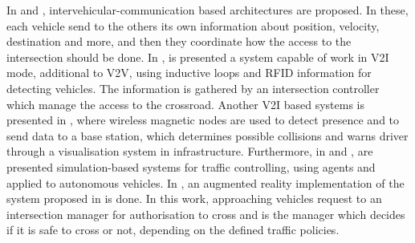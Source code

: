 In \cite{Ball2010} and \cite{Azimi2012}, intervehicular-communication based architectures are proposed. In these, each vehicle send to the others its own information about position, velocity, destination and more, and then they coordinate how the access to the intersection should be done. In \cite{Guerrero-Ibanez2013}, is presented a system capable of work in V2I mode, additional to V2V, using inductive loops and RFID information for detecting vehicles. The information is gathered by an intersection controller which manage the access to the crossroad. Another V2I based systems is presented in \cite{Basma2011}, where wireless magnetic nodes are used to detect presence and to send data to a base station, which determines possible collisions and warns driver through a visualisation system in infrastructure. Furthermore, in \cite{Dresner2008} and \cite{CondeBento2012}, are presented simulation-based systems for traffic controlling, using agents and applied to autonomous vehicles. In \cite{Quinlan2010}, an augmented reality implementation of the system proposed in \cite{Dresner2008} is done. In this work, approaching vehicles request to an intersection manager for authorisation to cross and is the manager which decides if it is safe to cross or not, depending on the defined traffic policies.


